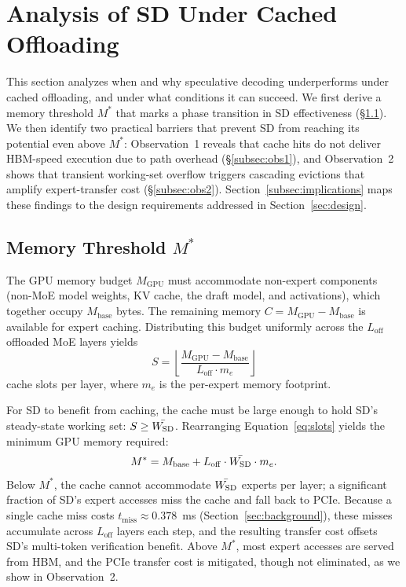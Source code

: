 \section{Analysis of SD Under Cached Offloading}
\label{sec:model}

This section analyzes when and why speculative decoding underperforms under cached offloading, and under what conditions it can succeed. We first derive a memory threshold $M^*$ that marks a phase transition in SD effectiveness (\S\ref{subsec:threshold}). We then identify two practical barriers that prevent SD from reaching its potential even above $M^*$: Observation~1 reveals that cache hits do not deliver HBM-speed execution due to path overhead (\S\ref{subsec:obs1}), and Observation~2 shows that transient working-set overflow triggers cascading evictions that amplify expert-transfer cost (\S\ref{subsec:obs2}). Section~\ref{subsec:implications} maps these findings to the design requirements addressed in Section~\ref{sec:design}.

\subsection{Memory Threshold $M^*$}
\label{subsec:threshold}

The GPU memory budget $M_{\mathrm{GPU}}$ must accommodate non-expert components (non-MoE model weights, KV cache, the draft model, and activations), which together occupy $M_{\mathrm{base}}$ bytes. The remaining memory $C = M_{\mathrm{GPU}} - M_{\mathrm{base}}$ is available for expert caching. Distributing this budget uniformly across the $L_{\mathrm{off}}$ offloaded MoE layers yields
\begin{equation}
\label{eq:slots}
S = \left\lfloor \frac{M_{\mathrm{GPU}} - M_{\mathrm{base}}}{L_{\mathrm{off}} \cdot m_e} \right\rfloor
\end{equation}
cache slots per layer, where $m_e$ is the per-expert memory footprint.

For SD to benefit from caching, the cache must be large enough to hold SD's steady-state working set: $S \ge \bar{W_{\mathrm{SD}}}$. Rearranging Equation~\ref{eq:slots} yields the minimum GPU memory required:
\begin{equation}
\label{eq:mstar}
M^* = M_{\mathrm{base}} + L_{\mathrm{off}} \cdot \bar{W_{\mathrm{SD}}} \cdot m_e.
\end{equation}
Below $M^*$, the cache cannot accommodate $\bar{W_{\mathrm{SD}}}$ experts per layer; a significant fraction of SD's expert accesses miss the cache and fall back to PCIe. Because a single cache miss costs $t_{\mathrm{miss}} \approx 0.378$~ms (Section~\ref{sec:background}), these misses accumulate across $L_{\mathrm{off}}$ layers each step, and the resulting transfer cost offsets SD's multi-token verification benefit. Above $M^*$, most expert accesses are served from HBM, and the PCIe transfer cost is mitigated, though not eliminated, as we show in Observation~2.

